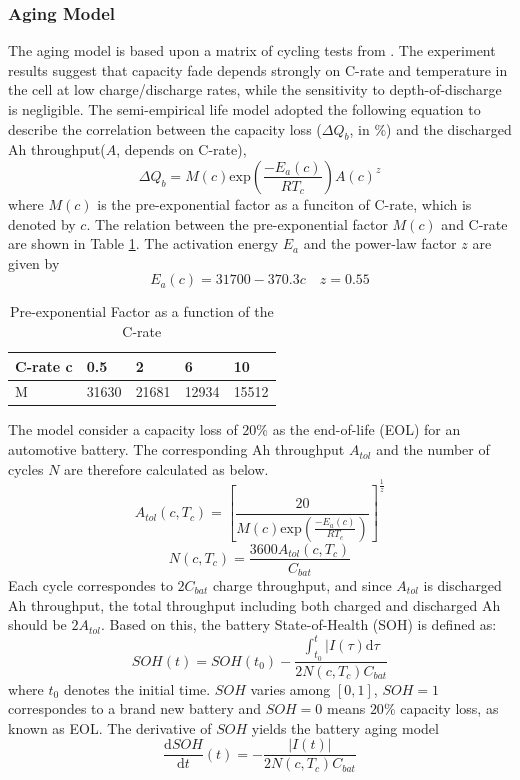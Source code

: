 \documentclass[12pt]{article}
\begin{document}
\subsubsection{Aging Model}
The aging model is based upon a matrix of cycling tests from \cite{ref:3}. The experiment results suggest that capacity fade depends strongly on C-rate and temperature in the cell at low charge/discharge rates, while the sensitivity to depth-of-discharge is negligible. The semi-empirical life model adopted the following equation to describe the correlation between the capacity loss ($\Delta Q_b$, in $\%$) and the discharged Ah throughput($A$, depends on C-rate),
\begin{equation}
\Delta Q_b = M(c)\mathrm{exp}\left(\frac{-E_a(c)}{RT_c}\right)A(c)^z
\end{equation}
where $M(c)$ is the pre-exponential factor as a funciton of C-rate, which is denoted by $c$. The relation between the pre-exponential factor $M(c)$ and C-rate are shown in Table \ref{t6}. The activation energy $E_a$ and the power-law factor $z$ are given by
\begin{equation}
E_a(c)=31700-370.3c  \quad z=0.55
\end{equation}
\begin{table}[H]
	\caption{Pre-exponential Factor as a function of the C-rate}
	\vspace{-0.4cm}
	\centering
	\begin{tabular}{lllll}
		\hline
		C-rate c & 0.5 & 2 & 6 & 10 \\
		\hline
		M & 31630 & 21681 & 12934 & 15512  \\
		\hline
	\end{tabular}
	\label{t6}
\end{table}
\noindent The model consider a capacity loss of $20\%$ as the end-of-life (EOL) for an automotive battery. The corresponding Ah throughput $A_{tol}$ and the number of cycles $N$ are therefore calculated as below.
\begin{equation}
A_{tol} (c, T_c) = \left[ \frac{20}{M(c)\mathrm{exp}\left(\frac{-E_a(c)}{RT_c}\right)} \right]^{\frac{1}{z}}
\end{equation}
\begin{equation}
N(c, T_c) = \frac{3600A_{tol} (c, T_c) }{C_{bat}}
\end{equation}
Each cycle correspondes to $2C_{bat}$ charge throughput, and since $A_{tol}$ is discharged Ah throughput, the total throughput including both charged and discharged Ah should be $2A_{tol}$. Based on this, the battery State-of-Health (SOH) is defined as: 
\begin{equation}
SOH(t) = SOH(t_0)-\frac{\int_{t_0}^{t}|I(\tau)\mathrm{d}\tau}{2N(c, T_c) C_{bat}}
\end{equation}
where $t_0$ denotes the initial time. $SOH$ varies among $[0,1]$, $SOH=1$ correspondes to a brand new battery and $SOH=0$  means $20\%$ capacity loss, as known as EOL. The derivative of $SOH$ yields the battery aging model
\begin{equation}
\frac{\mathrm{d} SOH}{\mathrm{d}t}(t) = -\frac{|I(t)|}{2N(c, T_c) C_{bat}}
\end{equation}
\end{document}
